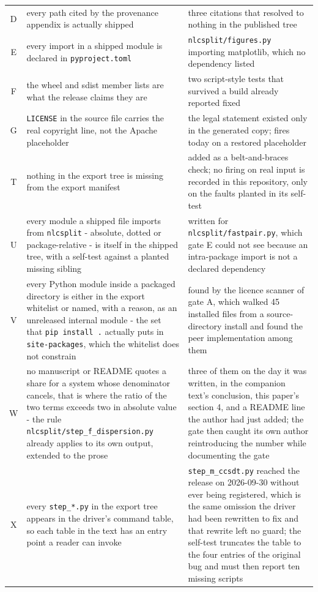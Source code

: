 \documentclass[11pt]{article}
\begin{document}
\begin{longtable}{c>{\raggedright\arraybackslash}p{}>{\raggedright\arraybackslash}p{}}
D & every path cited by the provenance appendix is actually shipped & three citations that resolved to nothing in the published tree \\
E & every import in a shipped module is declared in \texttt{pyproject.toml} & \texttt{nlcsplit/figures.py} importing matplotlib, which no dependency listed \\
F & the wheel and sdist member lists are what the release claims they are & two script-style tests that survived a build already reported fixed \\
G & \texttt{LICENSE} in the source file carries the real copyright line, not the Apache placeholder & the legal statement existed only in the generated copy; fires today on a restored placeholder \\
T & nothing in the export tree is missing from the export manifest & added as a belt-and-braces check; no firing on real input is recorded in this repository, only on the faults planted in its self-test \\
U & every module a shipped file imports from \texttt{nlcsplit} - absolute, dotted or package-relative - is itself in the shipped tree, with a self-test against a planted missing sibling & written for \texttt{nlcsplit/fastpair.py}, which gate E could not see because an intra-package import is not a declared dependency \\
V & every Python module inside a packaged directory is either in the export whitelist or named, with a reason, as an unreleased internal module - the set that \texttt{pip install .} actually puts in \texttt{site-packages}, which the whitelist does not constrain & found by the licence scanner of gate A, which walked 45 installed files from a source-directory install and found the peer implementation among them \\
W & no manuscript or README quotes a share for a system whose denominator cancels, that is where the ratio of the two terms exceeds two in absolute value - the rule \texttt{nlcsplit/\allowbreak{}step\_\allowbreak{}f\_\allowbreak{}dispersion.py} already applies to its own output, extended to the prose & three of them on the day it was written, in the companion text's conclusion, this paper's section 4, and a README line the author had just added; the gate then caught its own author reintroducing the number while documenting the gate \\
X & every \texttt{step\_*.py} in the export tree appears in the driver's command table, so each table in the text has an entry point a reader can invoke & \texttt{step\_m\_ccsdt.py} reached the release on 2026-09-30 without ever being registered, which is the same omission the driver had been rewritten to fix and that rewrite left no guard; the self-test truncates the table to the four entries of the original bug and must then report ten missing scripts \\

\end{longtable}
\end{document}
